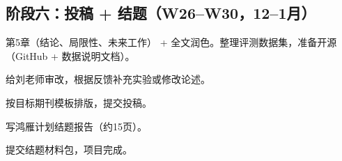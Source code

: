 \documentclass[a4paper, 11pt]{ctexart}
\begin{document}
\subsection{阶段六：投稿 + 结题（W26--W30，12--1月）}

\begin{description}[style=nextline, leftmargin=1.2cm, labelwidth=1cm, font=\bfseries\color{tsinghua}]
\item[W26] 第5章（结论、局限性、未来工作） + 全文润色。整理评测数据集，准备开源（GitHub + 数据说明文档）。
\item[W27] 给刘老师审改，根据反馈补充实验或修改论述。
\item[W28] 按目标期刊模板排版，提交投稿。
\item[W29] 写鸿雁计划结题报告（约15页）。
\item[W30] 提交结题材料包，项目完成。
\end{description}
\end{document}
